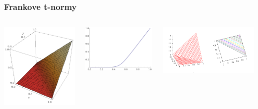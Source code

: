 \documentclass{beamer}
\begin{document}
\begin{frame}
\frametitle{Frankove t-normy}
\begin{columns}
\begin{minipage}[c][0.4\textheight][c]{\linewidth}
  \centering
  \includegraphics[width=0.5\linewidth]{FT/FT30000}
\end{minipage}
\begin{minipage}[c][0.4\textheight][c]{\linewidth}
  \centering
  \includegraphics[width=0.7\linewidth]{FT/FT30000-diag}
\end{minipage}
\begin{minipage}[c][0.4\textheight][c]{\linewidth}
  \centering
  \includegraphics[width=1.1\linewidth]{LukasiewiczTnorm}

\end{minipage}
\end{columns}
\end{frame}
\end{document}
